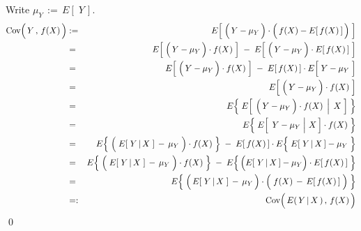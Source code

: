 \proof
Write $\mu_{Y} \,:=\, E\!\left[\;Y\,\right]$.
\begin{eqnarray*}
\Cov\!\left(\,\overset{{\color{white}.}}{Y}\,,\,f(X)\,\right)
&:=&
	E\!\left[\;\left(\,\overset{{\color{white}.}}{Y} - \mu_{Y}\,\right) \cdot \left(\,\overset{{\color{white}.}}{f}(X) - E[\,f(X)\,]\,\right)\;\right]
\\
&=&
	E\!\left[\;\left(\,\overset{{\color{white}.}}{Y} - \mu_{Y}\,\right) \cdot f(X)\;\right]
	\; - \;
	E\!\left[\;\left(\,\overset{{\color{white}.}}{Y} - \mu_{Y}\,\right) \cdot E[\,f(X)\,]\;\right]
\\
&=&
	E\!\left[\;\left(\,\overset{{\color{white}.}}{Y} - \mu_{Y}\,\right) \cdot f(X)\;\right]
	\; - \;
	E[\,f(X)\,] \cdot E\!\left[\;\overset{{\color{white}.}}{Y} - \mu_{Y}\;\right]
\\
&=&
	E\!\left[\;\left(\,\overset{{\color{white}.}}{Y} - \mu_{Y}\,\right) \cdot f(X)\;\right]
\\
&=&
	E\!\left\{\;
		E\!\left[\;\left.\left(\,\overset{{\color{white}.}}{Y} - \mu_{Y}\,\right) \cdot f(X)\;\,\right\vert\;X\;\right]
	\;\right\}
\\
&=&
	E\!\left\{\;
		E\!\left[\,\left.\,\overset{{\color{white}.}}{Y} - \mu_{Y}\;\right\vert\,X\,\right]
		\cdot
		f(X)
	\;\right\}
\\
&=&
	E\!\left\{\;
		\left(\;\overset{{\color{white}.}}{E}\!\left[\;Y\,\vert\,X\;\right] \,-\, \mu_{Y}\;\right)
		\cdot
		f(X)
	\;\right\}
	\; - \;
	E[\,f(X)\,] \cdot E\!\left\{\;\overset{{\color{white}.}}{E}[\;Y\,\vert\,X\,] - \mu_{Y}\;\right\}
\\
&=&
	E\!\left\{\;
		\left(\;\overset{{\color{white}.}}{E}\!\left[\;Y\,\vert\,X\;\right] \,-\, \mu_{Y}\;\right)
		\cdot
		f(X)
	\;\right\}
	\; - \;
	E\!\left\{\,\left(\overset{{\color{white}.}}{E}[\;Y\,\vert\,X\,] - \mu_{Y}\right) \cdot E[\,f(X)\,]\;\right\}
\\
&=&
	E\!\left\{\;
		\left(\,\overset{{\color{white}.}}{E}\!\left[\;Y\,\vert\,X\;\right] \,-\, \mu_{Y}\,\right)
		\cdot
		\left(\;\overset{{\color{white}.}}{f}(X)\,-\,E[\,f(X)\,]\;\right)
	\;\right\}
\\
&=:&
	\Cov\!\left(\,\overset{{\color{white}.}}{E}(\,Y\,\vert\,X\,)\,,\,f(X)\,\right)
\end{eqnarray*}
\qed


